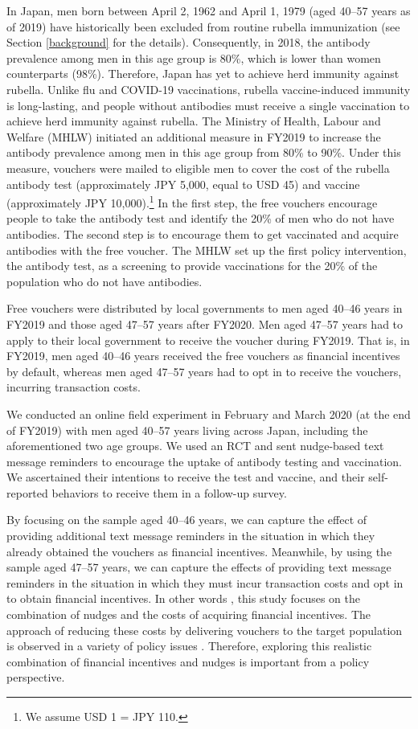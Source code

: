 \documentclass[
  11pt,
  a4paper
]{article}
\begin{document}
In Japan, men born between April 2, 1962 and April 1, 1979 (aged 40--57 years as of 2019) have historically been excluded from routine rubella immunization (see Section \ref{background} for the details). Consequently, in 2018, the antibody prevalence among men in this age group is 80\%, which is lower than women counterparts (98\%). Therefore, Japan has yet to achieve herd immunity against rubella. Unlike flu and COVID-19 vaccinations, rubella vaccine-induced immunity is long-lasting, and people without antibodies must receive a single vaccination to achieve herd immunity against rubella. The Ministry of Health, Labour and Welfare (MHLW) initiated an additional measure in FY2019 to increase the antibody prevalence among men in this age group from 80\% to 90\%. Under this measure, vouchers were mailed to eligible men to cover the cost of the rubella antibody test (approximately JPY 5,000, equal to USD 45) and vaccine (approximately JPY 10,000).\footnote{We assume USD 1 = JPY 110.} In the first step, the free vouchers encourage people to take the antibody test and identify the 20\% of men who do not have antibodies. The second step is to encourage them to get vaccinated and acquire antibodies with the free voucher. The MHLW set up the first policy intervention, the antibody test, as a screening to provide vaccinations for the 20\% of the population who do not have antibodies.

Free vouchers were distributed by local governments to men aged 40--46 years in FY2019 and those aged 47--57 years after FY2020. Men aged 47--57 years had to apply to their local government to receive the voucher during FY2019. That is, in FY2019, men aged 40--46 years received the free vouchers as financial incentives by default, whereas men aged 47--57 years had to opt in to receive the vouchers, incurring transaction costs.

We conducted an online field experiment in February and March 2020 (at the end of FY2019) with men aged 40--57 years living across Japan, including the aforementioned two age groups. We used an RCT and sent nudge-based text message reminders to encourage the uptake of antibody testing and vaccination. We ascertained their intentions to receive the test and vaccine, and their self-reported behaviors to receive them in a follow-up survey.

By focusing on the sample aged 40--46 years, we can capture the effect of providing additional text message reminders in the situation in which they already obtained the vouchers as financial incentives. Meanwhile, by using the sample aged 47--57 years, we can capture the effects of providing text message reminders in the situation in which they must incur transaction costs and opt in to obtain financial incentives. In other words , this study focuses on the combination of nudges and the costs of acquiring financial incentives. The approach of reducing these costs by delivering vouchers to the target population is observed in a variety of policy issues \citep[e.g.,][]{Ahmed2011, Kacker2022}. Therefore, exploring this realistic combination of financial incentives and nudges is important from a policy perspective.
\end{document}
